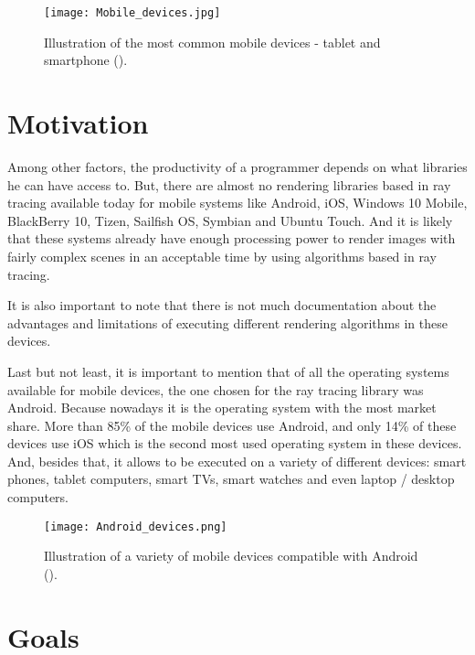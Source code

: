 \begin{figure}[H]
\centering
\caption{Illustration of the most common mobile devices - tablet and smartphone (\cite{JournalDuNet}).}
\label{Illustration of the most common mobile devices - tablet and smartphone}
\texttt{[image: Mobile\_devices.jpg]}
\end{figure}

\section{Motivation}

\par
Among other factors, the productivity of a programmer depends on what libraries he can have access to.
But, there are almost no rendering libraries based in ray tracing available today for mobile systems like Android, iOS, Windows 10 Mobile, BlackBerry 10, Tizen, Sailfish OS, Symbian and Ubuntu Touch.
And it is likely that these systems already have enough processing power to render images with fairly complex scenes in an acceptable time by using algorithms based in ray tracing.

\par
It is also important to note that there is not much documentation about the advantages and limitations of executing different rendering algorithms in these devices.

\par
Last but not least, it is important to mention that of all the operating systems available for mobile devices, the one chosen for the ray tracing library was Android.
Because nowadays it is the operating system with the most market share.
More than 85\% of the mobile devices use Android, and only 14\% of these devices use iOS which is the second most used operating system in these devices.
And, besides that, it allows to be executed on a variety of different devices: smart phones, tablet computers, smart TVs, smart watches and even laptop / desktop computers.

\begin{figure}[H]
	\centering
	\caption{Illustration of a variety of mobile devices compatible with Android (\cite{AndroidDevices}).}
	\label{Illustration of a variety of mobile devices compatible with Android}
	\texttt{[image: Android\_devices.png]}
\end{figure}


\section{Goals}

